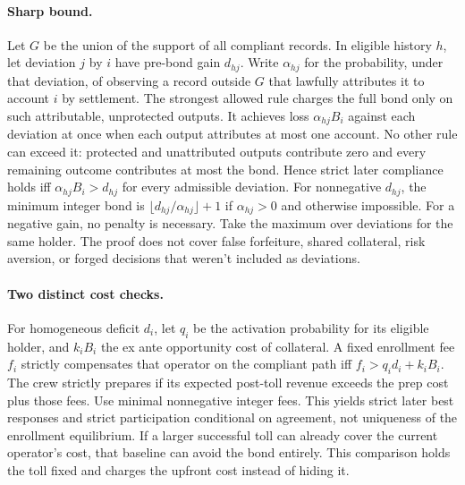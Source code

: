 \documentclass[11pt]{article}
\begin{document}
\paragraph{Sharp bound.}
Let \(G\) be the union of the support of all compliant records.
In eligible history \(h\), let deviation \(j\) by \(i\) have pre-bond
gain \(d_{hj}\). Write \(\alpha_{hj}\) for the probability, under that
deviation, of observing a record outside \(G\) that lawfully attributes
it to account \(i\) by settlement. The strongest allowed rule
charges the full bond only on such attributable, unprotected outputs.
It achieves loss \(\alpha_{hj}B_i\) against each deviation at once
when each output attributes at most one account. No other rule can
exceed it: protected and unattributed outputs contribute zero and
every remaining outcome contributes at most the bond.
Hence strict later compliance holds iff
\(\alpha_{hj}B_i>d_{hj}\) for every admissible deviation.
For nonnegative \(d_{hj}\), the minimum integer bond is
\(\lfloor d_{hj}/\alpha_{hj}\rfloor+1\) if \(\alpha_{hj}>0\) and
otherwise impossible. For a negative gain, no penalty is necessary.
Take the maximum over deviations for the same holder. The proof
does not cover false forfeiture, shared collateral, risk aversion,
or forged decisions that weren't included as deviations.

\paragraph{Two distinct cost checks.}
For homogeneous deficit \(d_i\), let \(q_i\) be the activation
probability for its eligible holder, and \(k_iB_i\) the ex ante
opportunity cost of collateral. A fixed enrollment fee \(f_i\)
strictly compensates that operator on the compliant path iff
\(f_i>q_i d_i+k_i B_i\). The crew strictly prepares if its expected
post-toll revenue exceeds the prep cost plus those fees. Use minimal
nonnegative integer fees. This yields strict later best responses and
strict participation conditional on agreement, not uniqueness of the
enrollment equilibrium. If a larger successful toll can already
cover the current operator's cost, that baseline can avoid the bond
entirely. This comparison holds the toll fixed and charges the
upfront cost instead of hiding it.
\end{document}
